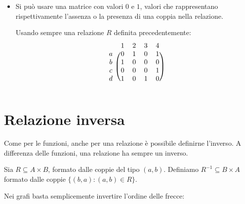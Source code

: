 \documentclass[12pt]{report}
\begin{document}
\begin{itemize}
\begin{figure}[H]
\begin{subfigure}[c]{0.48\textwidth}
			\end{subfigure}
			
		\end{figure}
		
		Il grafo diretto si applica in caso di una relazione su un singolo insieme:
		\[
		R \subseteq B \times B = \{(1, 1), (1, 2), (3, 4), (4, 1)\}
		\]
		
		\item Si può usare una matrice con valori $0$ e $1$, valori che rappresentano rispettivamente l'assenza o la presenza di una coppia nella relazione.
		
		Usando sempre una relazione $R$ definita precedentemente:
		\[
		\begin{blockarray}{ccccc}
			& 1 & 2 & 3 & 4 \\
			\begin{block}{c(cccc)}
				a & 0 & 1 & 0 & 1 \\
				b & 1 & 0 & 0 & 0 \\
				c & 0 & 0 & 0 & 1 \\
				d & 1 & 0 & 1 & 0 \\
			\end{block}
		\end{blockarray}
		\]

	\end{itemize}
	
	\section{Relazione inversa}
	Come per le funzioni, anche per una relazione è possibile definirne l'inverso. A differenza delle funzioni, una relazione ha sempre un inverso.
	
	Sia $R \subseteq A \times B$, formato dalle coppie del tipo $(a, b)$. Definiamo $R^{-1} \subseteq B \times A$ formato dalle coppie $\{(b, a) : (a, b) \in R\}$.
	
	Nei grafi basta semplicemente invertire l'ordine delle frecce:
	\begin{center}
		\hspace{2cm}
	\end{center}
	
\end{document}
